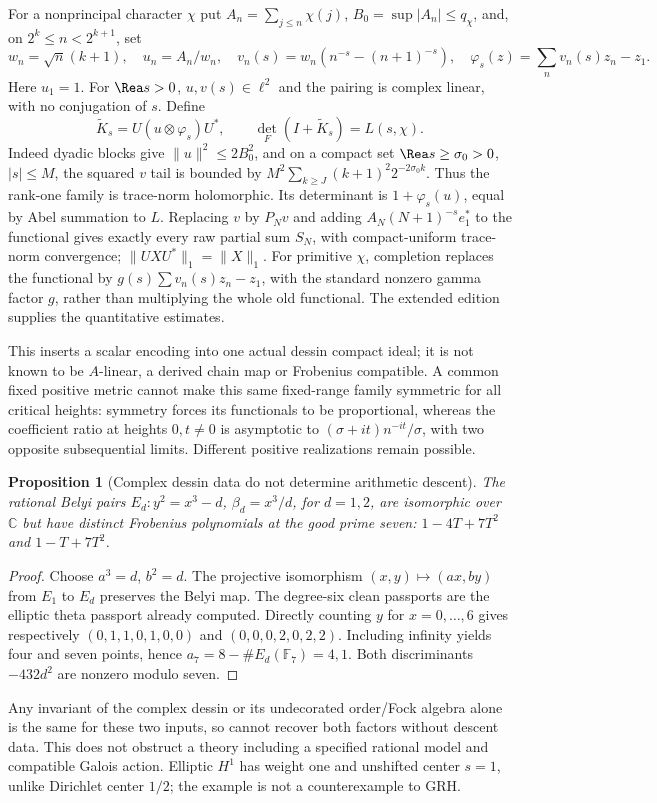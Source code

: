 \documentclass[11pt,oneside,openany]{book}
\newtheorem{proposition}[theorem]{Proposition}
\theoremstyle{definition}\newtheorem{definition}[theorem]{Definition}
\theoremstyle{remark}\newtheorem{remark}[theorem]{Remark}
\newcommand{\C}{\mathbb C}\newcommand{\Z}{\mathbb Z}\newcommand{\R}{\mathbb R}
\begin{document}
For a nonprincipal character $\chi$ put $A_n=\sum_{j\le n}\chi(j)$, $B_0=\sup|A_n|\le q_\chi$, and, on $2^k\le n<2^{k+1}$, set
\[
 w_n=\sqrt n(k+1),\quad u_n=A_n/w_n,\quad
 v_n(s)=w_n(n^{-s}-(n+1)^{-s}),\quad
 \varphi_s(z)=\sum_n v_n(s)z_n-z_1.
\]
Here $u_1=1$. For $\Rea s>0$, $u,v(s)\in\ell^2$ and the pairing is complex linear, with no conjugation of $s$. Define
\[
 \widetilde K_s=U(u\otimes\varphi_s)U^*,\qquad
 \det_F(I+\widetilde K_s)=L(s,\chi).
\]
Indeed dyadic blocks give $\|u\|^2\le2B_0^2$, and on a compact set $\Rea s\ge\sigma_0>0$, $|s|\le M$, the squared $v$ tail is bounded by $M^2\sum_{k\ge J}(k+1)^2 2^{-2\sigma_0k}$. Thus the rank-one family is trace-norm holomorphic. Its determinant is $1+\varphi_s(u)$, equal by Abel summation to $L$. Replacing $v$ by $P_Nv$ and adding $A_N(N+1)^{-s}e_1^*$ to the functional gives exactly every raw partial sum $S_N$, with compact-uniform trace-norm convergence; $\|UXU^*\|_1=\|X\|_1$. For primitive $\chi$, completion replaces the functional by $g(s)\sum v_n(s)z_n-z_1$, with the standard nonzero gamma factor $g$, rather than multiplying the whole old functional. The extended edition supplies the quantitative estimates.

This inserts a scalar encoding into one actual dessin compact ideal; it is not known to be $A$-linear, a derived chain map or Frobenius compatible. A common fixed positive metric cannot make this same fixed-range family symmetric for all critical heights: symmetry forces its functionals to be proportional, whereas the coefficient ratio at heights $0,t\ne0$ is asymptotic to $(\sigma+it)n^{-it}/\sigma$, with two opposite subsequential limits. Different positive realizations remain possible.

\begin{proposition}[Complex dessin data do not determine arithmetic descent]\label{thm:descent}
The rational Belyi pairs $E_d:y^2=x^3-d$, $\beta_d=x^3/d$, for $d=1,2$, are isomorphic over $\C$ but have distinct Frobenius polynomials at the good prime seven: $1-4T+7T^2$ and $1-T+7T^2$.
\end{proposition}
\begin{proof}
Choose $a^3=d$, $b^2=d$. The projective isomorphism $(x,y)\mapsto(ax,by)$ from $E_1$ to $E_d$ preserves the Belyi map. The degree-six clean passports are the elliptic theta passport already computed. Directly counting $y$ for $x=0,\ldots,6$ gives respectively $(0,1,1,0,1,0,0)$ and $(0,0,0,2,0,2,2)$. Including infinity yields four and seven points, hence $a_7=8-\#E_d(\mathbb F_7)=4,1$. Both discriminants $-432d^2$ are nonzero modulo seven.
\end{proof}
Any invariant of the complex dessin or its undecorated order/Fock algebra alone is the same for these two inputs, so cannot recover both factors without descent data. This does not obstruct a theory including a specified rational model and compatible Galois action. Elliptic $H^1$ has weight one and unshifted center $s=1$, unlike Dirichlet center $1/2$; the example is not a counterexample to GRH.
\end{document}
